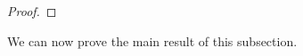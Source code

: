 \documentclass[a4paper,10pt
,draft
]{article}%
\renewcommand{\1}{\eta}%
\begin{document}
\begin{proof}
\end{proof}

We can now prove the main result of this subsection.
 
\end{document}
